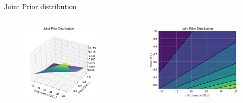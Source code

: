 \documentclass[
10pt,
aspectratio=169,
]{beamer}
\begin{document}
\begin{frame}{Joint Prior distribution}
\begin{columns}[onlytextwidth]
    \begin{figure}
    \centering
    \includegraphics[width=\textwidth]{joint3d.png}
\end{figure}
    \begin{figure}
    \centering
    \includegraphics[width=\textwidth]{prior_contour.png}
\end{figure}
\end{columns}
\end{frame}
\end{document}
